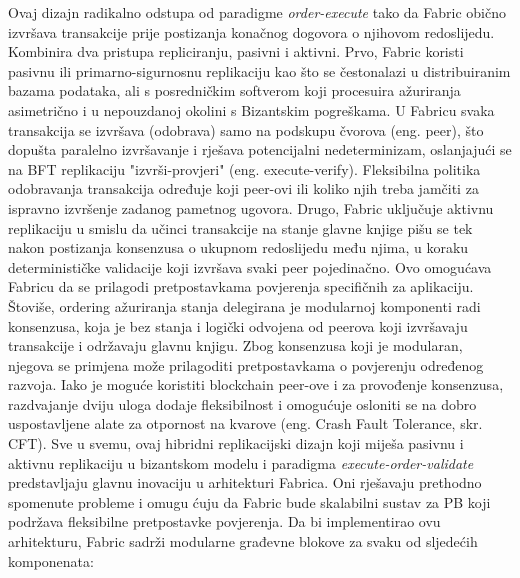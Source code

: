 \documentclass[times, utf8, diplomski]{fer}
\begin{document}
Ovaj dizajn radikalno odstupa od paradigme \textit{order-execute} tako da Fabric obično izvršava transakcije prije postizanja konačnog dogovora o njihovom redoslijedu. Kombinira dva pristupa repliciranju, pasivni i aktivni.
Prvo, Fabric koristi pasivnu ili primarno-sigurnosnu replikaciju kao što se čestonalazi u distribuiranim bazama podataka, ali s posredničkim softverom koji procesuira ažuriranja asimetrično i u nepouzdanoj okolini s Bizantskim pogreškama. U Fabricu svaka transakcija se izvršava (odobrava) samo na podskupu čvorova (eng. peer), što dopušta paralelno izvršavanje i rješava potencijalni nedeterminizam, oslanjajući se na BFT replikaciju "izvrši-provjeri" (eng. execute-verify). Fleksibilna politika odobravanja transakcija određuje koji peer-ovi ili koliko njih treba jamčiti za ispravno izvršenje zadanog pametnog ugovora.
Drugo, Fabric uključuje aktivnu replikaciju u smislu da učinci transakcije na stanje glavne knjige pišu se tek nakon postizanja konsenzusa o ukupnom redoslijedu među njima, u koraku determinističke validacije koji izvršava svaki peer pojedinačno. Ovo omogućava Fabricu da se prilagodi pretpostavkama povjerenja specifičnih za aplikaciju.
Štoviše, ordering ažuriranja stanja delegirana je modularnoj komponenti radi konsenzusa, koja je bez stanja i logički odvojena od peerova koji izvršavaju transakcije i održavaju glavnu knjigu. Zbog konsenzusa koji je modularan, njegova se primjena može prilagoditi pretpostavkama o povjerenju određenog razvoja. Iako je moguće koristiti blockchain peer-ove i za provođenje konsenzusa, razdvajanje dviju uloga dodaje fleksibilnost i omogućuje osloniti se na dobro uspostavljene alate za otpornost na kvarove
(eng. Crash Fault Tolerance, skr. CFT).
Sve u svemu, ovaj hibridni replikacijski dizajn koji miješa pasivnu i aktivnu replikaciju u bizantskom modelu i paradigma \textit{execute-order-validate} predstavljaju glavnu inovaciju u arhitekturi Fabrica. Oni rješavaju prethodno spomenute probleme i omugu ćuju da Fabric bude skalabilni sustav za PB koji podržava fleksibilne pretpostavke povjerenja. Da bi implementirao ovu arhitekturu, Fabric sadrži modularne građevne blokove za svaku od sljedećih komponenata:
\end{document}
